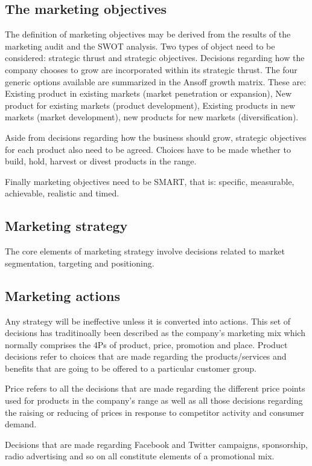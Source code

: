 \documentclass{article}
\begin{document}
\subsection{The marketing objectives}
The definition of marketing objectives may be derived from the results of the marketing audit and the SWOT analysis. Two types of object need to be considered: strategic thrust and strategic objectives. Decisions regarding how the company chooses to grow are incorporated within its strategic thrust. The four generic options available are summarized in the Ansoff growth matrix. These are: Existing product in existing markets (market penetration or expansion), New product for existing markets (product development), Existing products in new markets (market development), new products for new markets (diversification).

Aside from decisions regarding how the business should grow, strategic objectives for each product also need to be agreed. Choices have to be made whether to build, hold, harvest or divest products in the range.

Finally marketing objectives need to be SMART, that is: specific, measurable, achievable, realistic and timed.

\subsection{Marketing strategy}
The core elements of marketing strategy involve decisions related to market segmentation, targeting and positioning.

\subsection{Marketing actions}
Any strategy will be ineffective unless it is converted into actions. This set of decisions has traditinoally been described as the company's marketing mix which normally comprises the 4Ps of product, price, promotion and place. Product decisions refer to choices that are made regarding the products/services and benefits that are going to be offered to a particular customer group. 

Price refers to all the decisions that are made regarding the different price points used for products in the company's range as well as all those decisions regarding the raising or reducing of prices in response to competitor activity and consumer demand.

Decisions that are made regarding Facebook and Twitter campaigns, sponsorship, radio advertising and so on all constitute elements of a promotional mix. 
\end{document}
